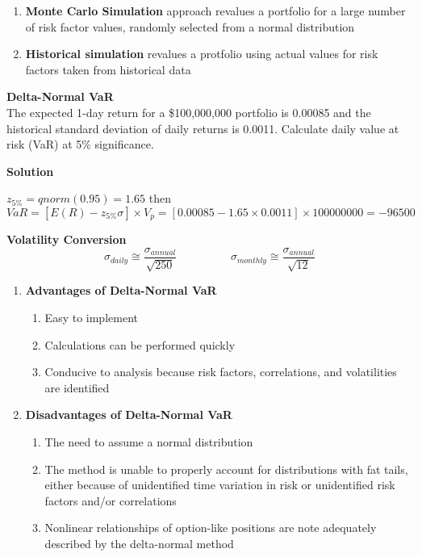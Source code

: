 \documentclass[11pt,fleqn]{report} %
\numberwithin{equation}{section} %
\numberwithin{figure}{section} %
\numberwithin{table}{section} %
\begin{document}
\begin{definition}
\begin{enumerate}
    \item \textbf{Monte Carlo Simulation} approach revalues a portfolio for a large number of risk factor values, randomly selected from a normal distribution
    \item \textbf{Historical simulation} revalues a protfolio using actual values for risk factors taken from historical data
\end{enumerate}
\end{definition}
\begin{exercise}\textbf{Delta-Normal VaR}\\
The expected 1-day return for a \$100,000,000 portfolio is 0.00085 and the historical standard deviation of daily returns is 0.0011. Calculate daily value at risk (VaR) at 5\% significance.

\textbf{Solution}

$z_{5\%}=qnorm(0.95)=1.65$ then
$$
VaR=[E(R)-z_{5\%}\sigma]\times V_p=[0.00085-1.65\times 0.0011]\times 100000000=-96500
$$
\end{exercise}
\begin{remark}\textbf{Volatility Conversion}
$$
\sigma_{daily}\cong\frac{\sigma_{annual}}{\sqrt{250}}\hspace{2cm}\sigma_{monthly}\cong\frac{\sigma_{annual}}{\sqrt{12}}
$$
\end{remark}
\begin{remark}
\begin{enumerate}
    \item \textbf{Advantages of Delta-Normal VaR}
    \begin{enumerate}
        \item Easy to implement
        \item Calculations can be performed quickly
        \item Conducive to analysis because risk factors, correlations, and volatilities are identified
    \end{enumerate}
    \item \textbf{Disadvantages of Delta-Normal VaR}
    \begin{enumerate}
        \item The need to assume a normal distribution
        \item The method is unable to properly account for distributions with fat tails, either because of unidentified time variation in risk or unidentified risk factors and/or correlations
        \item Nonlinear relationships of option-like positions are note adequately described by the delta-normal method
    \end{enumerate}
\end{enumerate}
\end{remark}
\end{document}
